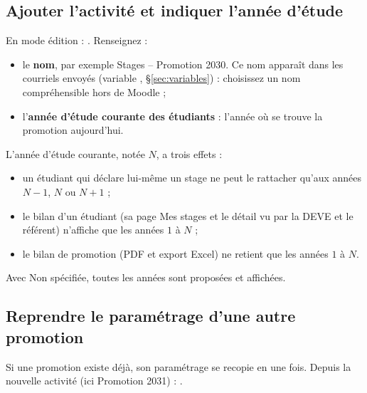 \documentclass[11pt,a4paper]{article}
\begin{document}
\subsection{Ajouter l'activité et indiquer l'année d'étude}
\label{sec:annee}

En mode édition : . Renseignez :
\begin{itemize}
  \item le \textbf{nom}, par exemple \og Stages -- Promotion 2030\fg{}. Ce nom
        apparaît dans les courriels envoyés (variable ,
        §\ref{sec:variables}) : choisissez un nom compréhensible hors de Moodle ;
  \item l'\textbf{année d'étude courante des étudiants} : l'année où se trouve
        la promotion aujourd'hui.
\end{itemize}


L'année d'étude courante, notée \(N\), a trois effets :
\begin{itemize}
  \item un étudiant qui déclare lui-même un stage ne peut le rattacher qu'aux
        années \(N-1\), \(N\) ou \(N+1\) ;
  \item le bilan d'un étudiant (sa page \og Mes stages\fg{} et le détail vu par
        la DEVE et le référent) n'affiche que les années \(1\) à \(N\) ;
  \item le bilan de promotion (PDF et export Excel) ne retient que les années
        \(1\) à \(N\).
\end{itemize}
Avec \og Non spécifiée\fg{}, toutes les années sont proposées et affichées.


\subsection{Reprendre le paramétrage d'une autre promotion}
\label{sec:import-cours}

Si une promotion existe déjà, son paramétrage se recopie en une fois. Depuis la
nouvelle activité (ici \og Promotion 2031\fg{}) :
.

\end{document}
